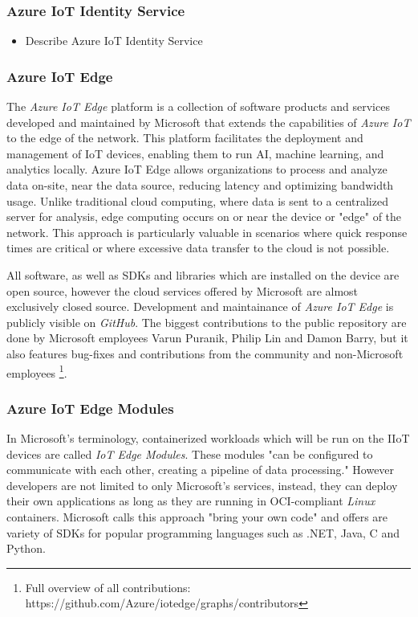 \subsubsection{Azure IoT Identity Service}
\begin{tcolorbox}[title=TODO]
    \begin{itemize}
        \item Describe Azure IoT Identity Service
    \end{itemize}
\end{tcolorbox}

\subsubsection{Azure IoT Edge}
The \textit{Azure IoT Edge} platform is a collection of software products and
services developed and maintained by Microsoft that extends the capabilities
of \textit{Azure IoT} to the edge of the network. This platform facilitates the
deployment and management of \ac{IoT} devices, enabling them to run \ac{AI},
machine learning, and analytics locally. Azure IoT Edge allows organizations to
process and analyze data on-site, near the data source, reducing latency and
optimizing bandwidth usage.
Unlike traditional cloud computing, where data is sent to a centralized server
for analysis, edge computing occurs on or near the device or "edge" of the
network. This approach is particularly valuable in scenarios where quick
response times are critical or where excessive data transfer to the cloud
is not possible\cite{msdoc-aziotedge}.

All software, as well as \ac{SDK}s and
libraries which are installed on the device are open source, however the
cloud services offered by Microsoft are almost exclusively closed source.
Development and maintainance of \textit{Azure IoT Edge} is publicly visible on
\textit{GitHub}. The biggest contributions
to the public repository are done by Microsoft employees Varun Puranik,
Philip Lin and Damon Barry, but it also features bug-fixes and contributions
from the community and non-Microsoft employees
\footnote{Full overview of all contributions: https://github.com/Azure/iotedge/graphs/contributors}.

\subsubsection{Azure IoT Edge Modules}
In Microsoft's terminology, containerized workloads which will be run on the \ac{IIoT}
devices are called \textit{IoT Edge Modules}. These modules "can be configured to
communicate with each other, creating a pipeline of data processing." However developers are
not limited to only Microsoft's services, instead, they can deploy their own
applications as long as they are running in \ac{OCI}-compliant \textit{Linux} containers.
Microsoft calls this approach "bring your own code" and offers are variety of
\ac{SDK}s for popular programming languages such as .NET, Java, C and Python\cite{msdoc-supportetplatforms}.

